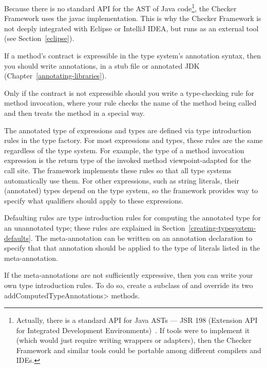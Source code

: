 Because there is no standard API for the AST of Java
code\footnote{Actually, there is a standard API for Java ASTs --- JSR 198
  (Extension API for Integrated Development Environments)~\cite{JSR198}.
  If tools were to implement it (which would just require writing wrappers
  or adapters), then the Checker Framework and similar tools could be
  portable among different compilers and IDEs.}, the Checker Framework uses
the javac implementation.  This is why the Checker Framework is not deeply
integrated with Eclipse or IntelliJ IDEA, but runs as an external tool (see
Section~\ref{eclipse}).



If a method's contract is expressible in the type system's annotation
syntax, then you should write annotations, in a stub file or annotated JDK
(Chapter~\ref{annotating-libraries}).

Only if the contract is not expressible should you write a type-checking
rule for method invocation, where your rule checks the name of the method
being called and then treats the method in a special way.



The annotated type of expressions and types are defined via type introduction rules in the
type factory.  For most expressions and types, these rules are the same regardless of the type system.
For example, the type of a method invocation expression is the return type of the invoked method
viewpoint-adapted for the call site.  The framework implements these rules so that all type systems
automatically use them.  For other expressions, such as string literals, their (annotated) types depend
on the type system, so the framework provides way to specify what qualifiers should apply to these expressions.

Defaulting rules are type introduction rules for computing the annotated type for an unannotated type;
these rules are explained in Section~\ref{creating-typesystem-defaults}. The meta-annotation  can be written on an annotation
declaration to specify that that annotation should be applied to the type of literals listed in the
meta-annotation.


If the meta-annotations are not sufficiently expressive, then you
can write your own type introduction rules.  To do so, create a subclass of
 and override its
two \<addComputedTypeAnnotations> methods.

